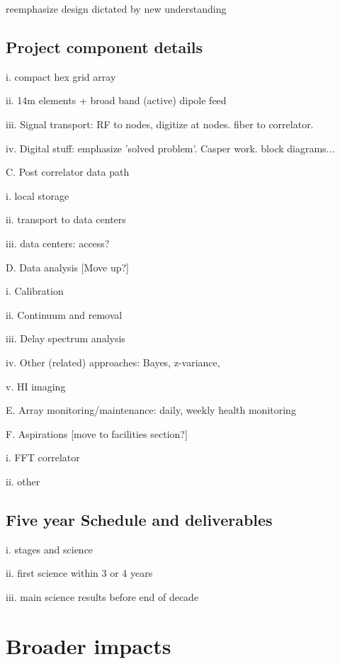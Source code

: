 \documentclass[preprint]{aastex}
\begin{document}
reemphasize design dictated by new understanding

\subsection{Project component details}  %

i. compact hex grid array

ii. 14m elements + broad band (active) dipole feed

iii. Signal transport: RF to nodes, digitize at nodes. fiber to correlator. 

iv. Digital stuff: emphasize 'solved problem'. Casper work. block diagrams...

C. Post correlator data path

i. local storage

ii. transport to data centers

iii. data centers: access? 

D. Data analysis [Move up?]

i. Calibration 

ii. Continuum and removal

iii. Delay spectrum analysis

iv. Other (related) approaches: Bayes, z-variance,

v. HI imaging

E. Array monitoring/maintenance: daily, weekly health monitoring

F. Aspirations [move to facilities section?]

i. FFT correlator

ii. other

\subsection{Five year Schedule and deliverables} %

i. stages and science

ii. first science within 3 or 4 years

iii. main science results before end of decade


\section{Broader impacts} %
\end{document}
